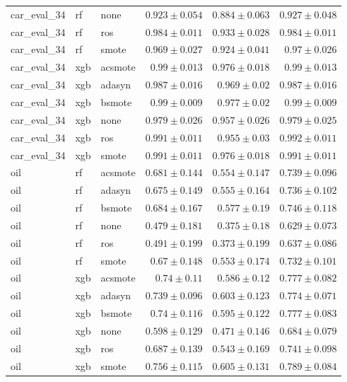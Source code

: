 \documentclass[conference,a4paper]{IEEEtran}
\begin{document}
\begin{table}[htbp]
\begin{tabular}{lllrrr}
car_eval_34 & rf & none & $0.923 \pm 0.054$ & $0.884 \pm 0.063$ & $0.927 \pm 0.048$ \\
car_eval_34 & rf & ros & $0.984 \pm 0.011$ & $0.933 \pm 0.028$ & $0.984 \pm 0.011$ \\
car_eval_34 & rf & smote & $0.969 \pm 0.027$ & $0.924 \pm 0.041$ & $0.97 \pm 0.026$ \\
car_eval_34 & xgb & acsmote & $0.99 \pm 0.013$ & $0.976 \pm 0.018$ & $0.99 \pm 0.013$ \\
car_eval_34 & xgb & adasyn & $0.987 \pm 0.016$ & $0.969 \pm 0.02$ & $0.987 \pm 0.016$ \\
car_eval_34 & xgb & bsmote & $0.99 \pm 0.009$ & $0.977 \pm 0.02$ & $0.99 \pm 0.009$ \\
car_eval_34 & xgb & none & $0.979 \pm 0.026$ & $0.957 \pm 0.026$ & $0.979 \pm 0.025$ \\
car_eval_34 & xgb & ros & $0.991 \pm 0.011$ & $0.955 \pm 0.03$ & $0.992 \pm 0.011$ \\
car_eval_34 & xgb & smote & $0.991 \pm 0.011$ & $0.976 \pm 0.018$ & $0.991 \pm 0.011$ \\
oil & rf & acsmote & $0.681 \pm 0.144$ & $0.554 \pm 0.147$ & $0.739 \pm 0.096$ \\
oil & rf & adasyn & $0.675 \pm 0.149$ & $0.555 \pm 0.164$ & $0.736 \pm 0.102$ \\
oil & rf & bsmote & $0.684 \pm 0.167$ & $0.577 \pm 0.19$ & $0.746 \pm 0.118$ \\
oil & rf & none & $0.479 \pm 0.181$ & $0.375 \pm 0.18$ & $0.629 \pm 0.073$ \\
oil & rf & ros & $0.491 \pm 0.199$ & $0.373 \pm 0.199$ & $0.637 \pm 0.086$ \\
oil & rf & smote & $0.67 \pm 0.148$ & $0.553 \pm 0.174$ & $0.732 \pm 0.101$ \\
oil & xgb & acsmote & $0.74 \pm 0.11$ & $0.586 \pm 0.12$ & $0.777 \pm 0.082$ \\
oil & xgb & adasyn & $0.739 \pm 0.096$ & $0.603 \pm 0.123$ & $0.774 \pm 0.071$ \\
oil & xgb & bsmote & $0.74 \pm 0.116$ & $0.595 \pm 0.122$ & $0.777 \pm 0.083$ \\
oil & xgb & none & $0.598 \pm 0.129$ & $0.471 \pm 0.146$ & $0.684 \pm 0.079$ \\
oil & xgb & ros & $0.687 \pm 0.139$ & $0.543 \pm 0.169$ & $0.741 \pm 0.098$ \\
oil & xgb & smote & $0.756 \pm 0.115$ & $0.605 \pm 0.131$ & $0.789 \pm 0.084$ \\
\bottomrule
\end{tabular}
\end{table}
\end{document}
